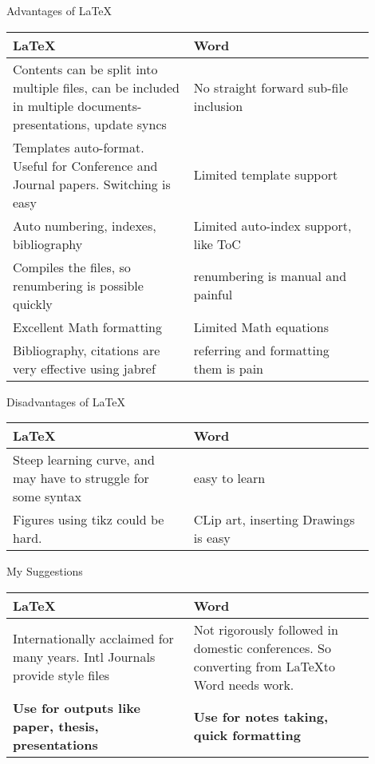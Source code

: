 \begin{frame}{Advantages of \LaTeX}
\begin{tabular}{@{}p{0.45\linewidth} | p{0.45\linewidth}@{}}\toprule
\textbf{\LaTeX} & \textbf{Word}\\ \midrule
Contents can be split into multiple files,  can be included in multiple documents-presentations, update syncs & No straight forward sub-file inclusion\\
Templates  auto-format. Useful for Conference and Journal papers. Switching is easy & Limited template support\\
Auto numbering, indexes, bibliography & Limited auto-index support, like ToC\\
Compiles the files, so renumbering is possible quickly & renumbering is manual and painful \\
Excellent Math formatting & Limited Math equations\\
Bibliography, citations are very effective using jabref & referring and formatting them is pain\\
\bottomrule
\end{tabular}
\end{frame}
\begin{frame}{Disadvantages of \LaTeX}
\begin{tabular}{@{}p{0.45\linewidth} | p{0.45\linewidth}@{}}\toprule
\textbf{\LaTeX} & \textbf{Word}\\ \midrule
Steep learning curve, and may have to struggle for some syntax & easy to learn\\
Figures using tikz could be hard. & CLip art, inserting Drawings is easy\\
\bottomrule
\end{tabular}
\end{frame}



\begin{frame}{My Suggestions}
\begin{tabular}{@{}p{0.45\linewidth} | p{0.45\linewidth}@{}}\toprule
\textbf{\LaTeX} & \textbf{Word}\\ \midrule
Internationally acclaimed for many years. Intl Journals provide style files & Not rigorously followed in domestic conferences. So converting from \LaTeX \thinspace to Word needs work.\\
\textbf{Use for outputs like paper, thesis, presentations} & \textbf{Use for notes taking, quick formatting}\\
\bottomrule
\end{tabular}
\end{frame}


